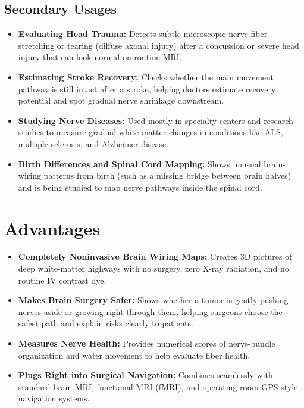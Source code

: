 \subsection{Secondary Usages}

\begin{itemize}
    \item \textbf{Evaluating Head Trauma:} Detects subtle microscopic nerve-fiber stretching or tearing (diffuse axonal injury) after a concussion or severe head injury that can look normal on routine MRI.
    \item \textbf{Estimating Stroke Recovery:} Checks whether the main movement pathway is still intact after a stroke, helping doctors estimate recovery potential and spot gradual nerve shrinkage downstream.
    \item \textbf{Studying Nerve Diseases:} Used mostly in specialty centers and research studies to measure gradual white-matter changes in conditions like ALS, multiple sclerosis, and Alzheimer disease.
    \item \textbf{Birth Differences and Spinal Cord Mapping:} Shows unusual brain-wiring patterns from birth (such as a missing bridge between brain halves) and is being studied to map nerve pathways inside the spinal cord.
\end{itemize}

\section{Advantages}

\begin{itemize}
    \item \textbf{Completely Noninvasive Brain Wiring Maps:} Creates 3D pictures of deep white-matter highways with no surgery, zero X-ray radiation, and no routine IV contrast dye.
    \item \textbf{Makes Brain Surgery Safer:} Shows whether a tumor is gently pushing nerves aside or growing right through them, helping surgeons choose the safest path and explain risks clearly to patients.
    \item \textbf{Measures Nerve Health:} Provides numerical scores of nerve-bundle organization and water movement to help evaluate fiber health.
    \item \textbf{Plugs Right into Surgical Navigation:} Combines seamlessly with standard brain MRI, functional MRI (fMRI), and operating-room GPS-style navigation systems.
\end{itemize}

